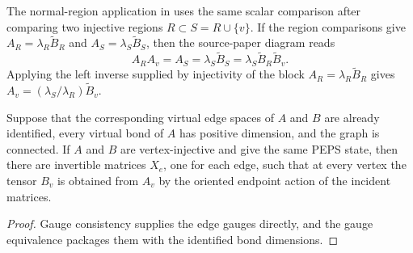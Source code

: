 \begin{remark}
    The normal-region application in \cite[Section~3]{Molnar2018NormalPEPS}
    uses the same scalar comparison after comparing two injective regions
    $R\subset S=R\cup\{v\}$. If the region comparisons give
    $A_R=\lambda_R\widetilde B_R$ and
    $A_S=\lambda_S\widetilde B_S$, then the source-paper diagram reads
    \[
        A_R A_v
        =
        A_S
        =
        \lambda_S\widetilde B_S
        =
        \lambda_S\widetilde B_R\widetilde B_v.
    \]
    Applying the left inverse supplied by injectivity of the block
    $A_R=\lambda_R\widetilde B_R$ gives
    $A_v=(\lambda_S/\lambda_R)\widetilde B_v$.
\end{remark}

\begin{theorem}%
    \label{thm:fundamentalTheorem_PEPS_of_bondDim}
    \leanok
    Suppose that the corresponding virtual edge spaces of $A$ and $B$ are
    already identified, every virtual bond of $A$ has positive dimension, and
    the graph is connected.
    If $A$ and $B$ are vertex-injective and give the same PEPS state, then
    there are invertible matrices $X_e$, one for each edge, such that at every
    vertex the tensor $B_v$ is obtained from $A_v$ by the oriented endpoint
    action of the incident matrices.
\end{theorem}
\begin{proof}\leanok
    Gauge consistency supplies the edge gauges directly, and the gauge
    equivalence packages them with the identified bond dimensions.
\end{proof}

